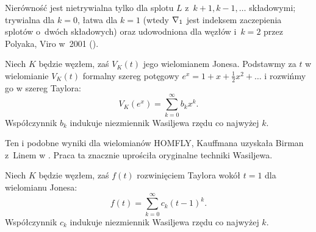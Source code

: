 Nierówność jest nietrywialna tylko dla splotu $L$ z~$k+1, k-1, \ldots$ składowymi; trywialna dla $k = 0$, łatwa dla $k=1$ (wtedy $\nabla_1$ jest indeksem zaczepienia splotów o~dwóch składowych) oraz udowodniona dla węzłów i~$k=2$ przez Polyaka, Viro w~2001 (\cite{polyak01}).

\begin{example}
    Niech $K$ będzie węzłem, zaś $V_K(t)$ jego wielomianem Jonesa.
    Podstawmy za $t$ w wielomianie $V_K(t)$ formalny szereg potęgowy $e^x = 1 + x + \frac12 x^2 + \ldots$ i rozwińmy go w szereg Taylora:
    \begin{equation}
        V_K(e^x) = \sum_{k = 0}^\infty b_k x^k.
    \end{equation}
    Współczynnik $b_{k}$ indukuje niezmiennik Wasiljewa rzędu co najwyżej $k$.
\end{example}

Ten i podobne wyniki dla wielomianów HOMFLY, Kauffmana uzyskała Birman z~Linem w \cite{birman93}.
Praca ta znacznie uprościła oryginalne techniki Wasiljewa.

\begin{example}
    Niech $K$ będzie węzłem, zaś $f(t)$ rozwinięciem Taylora wokół $t = 1$ dla wielomianu Jonesa:
    \begin{equation}
        f(t) = \sum_{k = 0}^\infty c_k (t-1)^k.
    \end{equation}
    Współczynnik $c_{k}$ indukuje niezmiennik Wasiljewa rzędu co najwyżej $k$.
\end{example}

